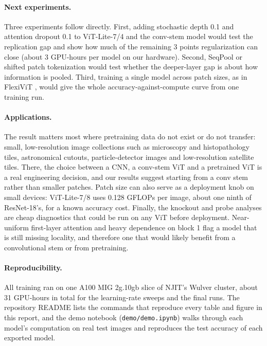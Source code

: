 \documentclass[11pt]{article}
\newcommand{\file}[1]{\nolinkurl{#1}}
\begin{document}
\paragraph{Next experiments.} Three experiments follow directly. First, adding stochastic depth 0.1 and attention dropout 0.1 to ViT-Lite-7/4 and the conv-stem model would test the replication gap and show how much of the remaining 3 points regularization can close (about 3 GPU-hours per model on our hardware). Second, SeqPool \citep{hassani2021cct} or shifted patch tokenization \citep{lee2021spt} would test whether the deeper-layer gap is about how information is pooled. Third, training a single model across patch sizes, as in FlexiViT \citep{beyer2023flexivit}, would give the whole accuracy-against-compute curve from one training run.

\paragraph{Applications.} The result matters most where pretraining data do not exist or do not transfer: small, low-resolution image collections such as microscopy and histopathology tiles, astronomical cutouts, particle-detector images and low-resolution satellite tiles. There, the choice between a CNN, a conv-stem ViT and a pretrained ViT is a real engineering decision, and our results suggest starting from a conv stem rather than smaller patches. Patch size can also serve as a deployment knob on small devices: ViT-Lite-7/8 uses 0.128 GFLOPs per image, about one ninth of ResNet-18's, for a known accuracy cost. Finally, the knockout and probe analyses are cheap diagnostics that could be run on any ViT before deployment. Near-uniform first-layer attention and heavy dependence on block 1 flag a model that is still missing locality, and therefore one that would likely benefit from a convolutional stem or from pretraining.

\paragraph{Reproducibility.} All training ran on one A100 MIG 2g.10gb slice of NJIT's Wulver cluster, about 31 GPU-hours in total for the learning-rate sweeps and the final runs. The repository README lists the commands that reproduce every table and figure in this report, and the demo notebook (\file{demo/demo.ipynb}) walks through each model's computation on real test images and reproduces the test accuracy of each exported model.

\FloatBarrier


\end{document}
